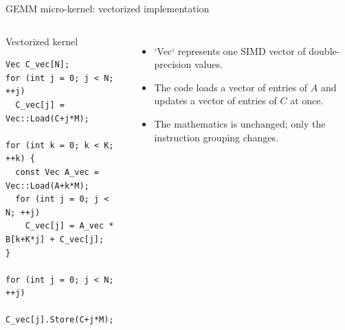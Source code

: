 \documentclass[aspectratio=169,11pt]{beamer}
\begin{document}
\begin{frame}[fragile]{GEMM micro-kernel: vectorized implementation}
\small
\begin{columns}[T]
\begin{block}{Vectorized kernel}
\tiny\ttfamily
\begin{verbatim}
Vec C_vec[N];
for (int j = 0; j < N; ++j)
  C_vec[j] = Vec::Load(C+j*M);

for (int k = 0; k < K; ++k) {
  const Vec A_vec = Vec::Load(A+k*M);
  for (int j = 0; j < N; ++j)
    C_vec[j] = A_vec * B[k+K*j] + C_vec[j];
}

for (int j = 0; j < N; ++j)
  C_vec[j].Store(C+j*M);
\end{verbatim}
\end{block}

\footnotesize
\begin{itemize}\setlength{\itemsep}{0.35em}
  \item `Vec` represents one SIMD vector of double-precision values.
  \item The code loads a vector of entries of $A$ and updates a vector of
        entries of $C$ at once.
  \item The mathematics is unchanged; only the instruction grouping changes.
\end{itemize}
\end{columns}
\end{frame}
\end{document}
